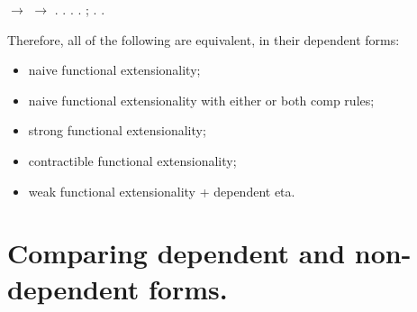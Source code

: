 \documentclass[12pt]{report}
\begin{document}
\begin{coqdoccode}
\coqdocindent{1.00em}
 \ensuremath{\rightarrow}  \ensuremath{\rightarrow} .\coqdoceol
\coqdocnoindent
{}.\coqdoceol
\coqdocindent{1.00em}
  .\coqdoceol
\coqdocindent{1.00em}
 .\coqdoceol
\coqdocindent{1.00em}
 ; .\coqdoceol
\coqdocnoindent
{}.\coqdoceol
\coqdocemptyline
\end{coqdoccode}
Therefore, all of the following are equivalent, in their dependent forms:

\begin{itemize}
\item  naive functional extensionality;

\item  naive functional extensionality with either or both comp rules;

\item  strong functional extensionality;

\item  contractible functional extensionality;

\item  weak functional extensionality + dependent eta. 
\end{itemize}
\begin{coqdoccode}
\coqdocemptyline
\end{coqdoccode}
\section{Comparing dependent and non-dependent forms.}
\end{document}
